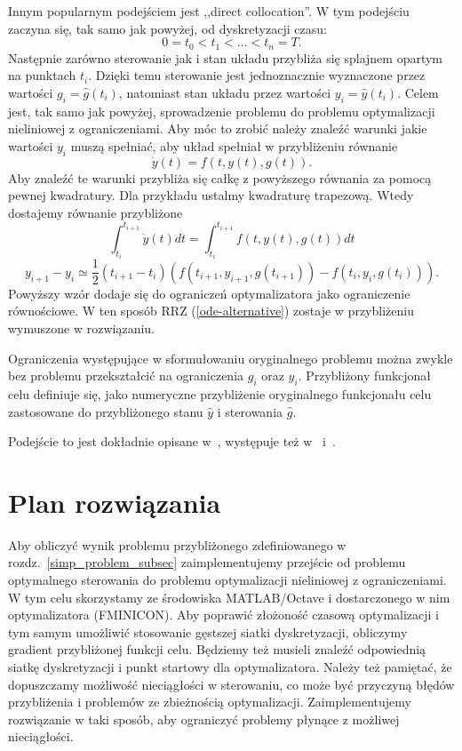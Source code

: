 \documentclass[licencjacka]{pracamgr}
\begin{document}
Innym popularnym podejściem jest ,,direct collocation''. W tym podejściu zaczyna się, tak samo jak powyżej, od dyskretyzacji czasu:
\begin{equation}
  0 = t_0 < t_1 < \ldots < t_n = T.
\end{equation}
Następnie zarówno sterowanie jak i stan układu przybliża się splajnem opartym na punktach $t_i$. Dzięki temu sterowanie jest jednoznacznie wyznaczone przez wartości $g_i = \hat{g}(t_i)$, natomiast stan układu przez wartości $y_i = \hat{y}(t_i)$. Celem jest, tak samo jak powyżej, sprowadzenie problemu do problemu optymalizacji nieliniowej z ograniczeniami. Aby móc to zrobić należy znaleźć warunki jakie wartości $y_i$ muszą spełniać, aby układ spełniał w przybliżeniu równanie
\begin{equation}\label{ode-alternative}
  \dot{y}(t) = f(t,y(t),g(t)).
\end{equation}
Aby znaleźć te warunki przybliża się całkę z powyższego równania za pomocą pewnej kwadratury. Dla przykładu ustalmy kwadraturę trapezową. Wtedy dostajemy równanie przybliżone
\begin{equation}
  \int_{t_i}^{t_{i+1}} \dot{y}(t)dt = \int_{t_i}^{t_{i+1}} f(t,y(t),g(t))dt
\end{equation}
\begin{equation}
  y_{i+1} - y_{i} \simeq \frac{1}{2}(t_{i+1}-t_i)(f(t_{i+1}, y_{i+1}, g(t_{i+1})) - f(t_i, y_i, g(t_i))).
\end{equation}
Powyższy wzór dodaje się do ograniczeń optymalizatora jako ograniczenie równościowe. W ten sposób RRZ (\ref{ode-alternative}) zostaje w przybliżeniu wymuszone w rozwiązaniu.

Ograniczenia występujące w sformułowaniu oryginalnego problemu można zwykle bez problemu przekształcić na ograniczenia $g_i$ oraz $y_i$. Przybliżony funkcjonał celu definiuje się, jako numeryczne przybliżenie oryginalnego funkcjonału celu zastosowane do przybliżonego stanu $\hat{y}$ i sterowania $\hat{g}$.

Podejście to jest dokładnie opisane w~\cite{Kelly}, występuje też w~\cite{diehl} i~\cite{rao-methods}.

\section{Plan rozwiązania}
Aby obliczyć wynik problemu przybliżonego zdefiniowanego w rozdz.~\ref{simp_problem_subsec} zaimplementujemy przejście od problemu optymalnego sterowania do problemu optymalizacji nieliniowej z ograniczeniami. W tym celu skorzystamy ze środowiska MATLAB/Octave i dostarczonego w nim optymalizatora (FMINICON). Aby poprawić złożoność czasową optymalizacji i tym samym umożliwić stosowanie gęstszej siatki dyskretyzacji, obliczymy gradient przybliżonej funkcji celu. Będziemy też musieli znaleźć odpowiednią siatkę dyskretyzacji i punkt startowy dla optymalizatora. Należy też pamiętać, że dopuszczamy możliwość nieciągłości w sterowaniu, co może być przyczyną błędów przybliżenia i problemów ze zbieżnością optymalizacji. Zaimplementujemy rozwiązanie w taki sposób, aby ograniczyć problemy płynące z możliwej nieciągłości.
\end{document}
